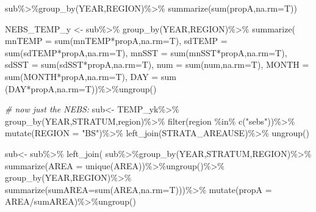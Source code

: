 \documentclass[
]{article}
\newenvironment{Shaded}{\begin{snugshade}}{\end{snugshade}}
\newcommand{\AttributeTok}[1]{\textcolor[rgb]{0.77,0.63,0.00}{#1}}
\newcommand{\CommentTok}[1]{\textcolor[rgb]{0.56,0.35,0.01}{\textit{#1}}}
\newcommand{\FunctionTok}[1]{\textcolor[rgb]{0.00,0.00,0.00}{#1}}
\newcommand{\NormalTok}[1]{#1}
\newcommand{\OtherTok}[1]{\textcolor[rgb]{0.56,0.35,0.01}{#1}}
\newcommand{\SpecialCharTok}[1]{\textcolor[rgb]{0.00,0.00,0.00}{#1}}
\newcommand{\StringTok}[1]{\textcolor[rgb]{0.31,0.60,0.02}{#1}}
\begin{document}
\begin{Shaded}
\begin{Highlighting}[]
\NormalTok{  sub}\SpecialCharTok{\%\textgreater{}\%}\FunctionTok{group\_by}\NormalTok{(YEAR,REGION)}\SpecialCharTok{\%\textgreater{}\%}
        \FunctionTok{summarize}\NormalTok{(}\FunctionTok{sum}\NormalTok{(propA,}\AttributeTok{na.rm=}\NormalTok{T))}
  
  
\NormalTok{  NEBS\_TEMP\_y }\OtherTok{\textless{}{-}}\NormalTok{ sub}\SpecialCharTok{\%\textgreater{}\%}
    \FunctionTok{group\_by}\NormalTok{(YEAR,REGION)}\SpecialCharTok{\%\textgreater{}\%}
    \FunctionTok{summarize}\NormalTok{(}
        \AttributeTok{mnTEMP =} \FunctionTok{sum}\NormalTok{(mnTEMP}\SpecialCharTok{*}\NormalTok{propA,}\AttributeTok{na.rm=}\NormalTok{T),}
        \AttributeTok{sdTEMP =} \FunctionTok{sum}\NormalTok{(sdTEMP}\SpecialCharTok{*}\NormalTok{propA,}\AttributeTok{na.rm=}\NormalTok{T),}
        \AttributeTok{mnSST  =} \FunctionTok{sum}\NormalTok{(mnSST}\SpecialCharTok{*}\NormalTok{propA,}\AttributeTok{na.rm=}\NormalTok{T),}
        \AttributeTok{sdSST  =} \FunctionTok{sum}\NormalTok{(sdSST}\SpecialCharTok{*}\NormalTok{propA,}\AttributeTok{na.rm=}\NormalTok{T),}
        \AttributeTok{num    =} \FunctionTok{sum}\NormalTok{(num,}\AttributeTok{na.rm=}\NormalTok{T),}
        \AttributeTok{MONTH  =} \FunctionTok{sum}\NormalTok{(MONTH}\SpecialCharTok{*}\NormalTok{propA,}\AttributeTok{na.rm=}\NormalTok{T),}
        \AttributeTok{DAY    =} \FunctionTok{sum}\NormalTok{ (DAY}\SpecialCharTok{*}\NormalTok{propA,}\AttributeTok{na.rm=}\NormalTok{T))}\SpecialCharTok{\%\textgreater{}\%}\FunctionTok{ungroup}\NormalTok{()}
  
   \CommentTok{\# now just the NEBS:}
\NormalTok{  sub}\OtherTok{\textless{}{-}}\NormalTok{ TEMP\_yk}\SpecialCharTok{\%\textgreater{}\%}
    \FunctionTok{group\_by}\NormalTok{(YEAR,STRATUM,region)}\SpecialCharTok{\%\textgreater{}\%}
    \FunctionTok{filter}\NormalTok{(region }\SpecialCharTok{\%in\%} \FunctionTok{c}\NormalTok{(}\StringTok{"sebs"}\NormalTok{))}\SpecialCharTok{\%\textgreater{}\%}
    \FunctionTok{mutate}\NormalTok{(}\AttributeTok{REGION =} \StringTok{"BS"}\NormalTok{)}\SpecialCharTok{\%\textgreater{}\%}
   \FunctionTok{left\_join}\NormalTok{(STRATA\_AREAUSE)}\SpecialCharTok{\%\textgreater{}\%}
    \FunctionTok{ungroup}\NormalTok{()}
  
\NormalTok{  sub}\OtherTok{\textless{}{-}}\NormalTok{ sub}\SpecialCharTok{\%\textgreater{}\%}
    \FunctionTok{left\_join}\NormalTok{(}
\NormalTok{      sub}\SpecialCharTok{\%\textgreater{}\%}\FunctionTok{group\_by}\NormalTok{(YEAR,STRATUM,REGION)}\SpecialCharTok{\%\textgreater{}\%}
        \FunctionTok{summarize}\NormalTok{(}\AttributeTok{AREA =} \FunctionTok{unique}\NormalTok{(AREA))}\SpecialCharTok{\%\textgreater{}\%}\FunctionTok{ungroup}\NormalTok{()}\SpecialCharTok{\%\textgreater{}\%}
        \FunctionTok{group\_by}\NormalTok{(YEAR,REGION)}\SpecialCharTok{\%\textgreater{}\%}
        \FunctionTok{summarize}\NormalTok{(}\AttributeTok{sumAREA=}\FunctionTok{sum}\NormalTok{(AREA,}\AttributeTok{na.rm=}\NormalTok{T)))}\SpecialCharTok{\%\textgreater{}\%}
    \FunctionTok{mutate}\NormalTok{(}\AttributeTok{propA =}\NormalTok{ AREA}\SpecialCharTok{/}\NormalTok{sumAREA)}\SpecialCharTok{\%\textgreater{}\%}\FunctionTok{ungroup}\NormalTok{()}
    

\end{Highlighting}
\end{Shaded}
\end{document}

